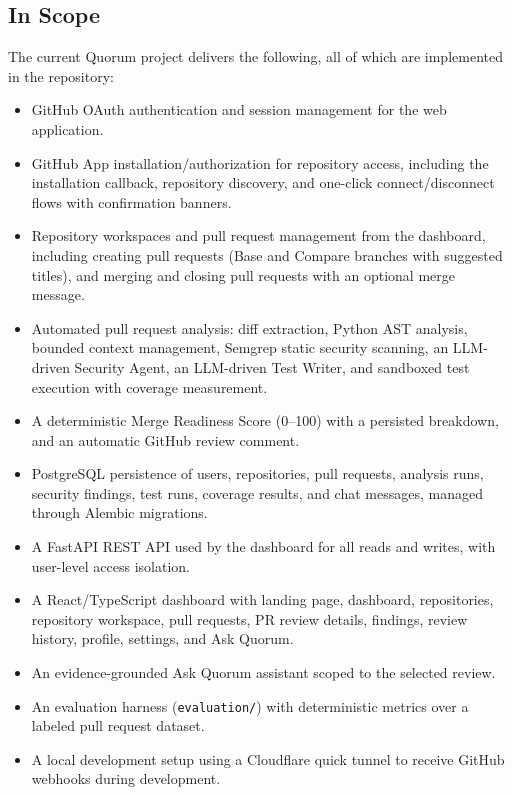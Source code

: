 \subsection{In Scope}

The current Quorum project delivers the following, all of which are implemented
in the repository:

\begin{itemize}
  \item GitHub OAuth authentication and session management for the web
        application.
  \item GitHub App installation/authorization for repository access, including
        the installation callback, repository discovery, and one-click
        connect/disconnect flows with confirmation banners.
  \item Repository workspaces and pull request management from the dashboard,
        including creating pull requests (Base and Compare branches with
        suggested titles), and merging and closing pull requests with an
        optional merge message.
  \item Automated pull request analysis: diff extraction, Python AST
        analysis, bounded context management, Semgrep static security
        scanning, an LLM-driven Security Agent, an LLM-driven Test Writer, and
        sandboxed test execution with coverage measurement.
  \item A deterministic Merge Readiness Score (0--100) with a persisted
        breakdown, and an automatic GitHub review comment.
  \item PostgreSQL persistence of users, repositories, pull requests, analysis
        runs, security findings, test runs, coverage results, and chat
        messages, managed through Alembic migrations.
  \item A FastAPI REST API used by the dashboard for all reads and writes,
        with user-level access isolation.
  \item A React/TypeScript dashboard with landing page, dashboard,
        repositories, repository workspace, pull requests, PR review details,
        findings, review history, profile, settings, and Ask Quorum.
  \item An evidence-grounded Ask Quorum assistant scoped to the selected
        review.
  \item An evaluation harness (\texttt{evaluation/}) with deterministic
        metrics over a labeled pull request dataset.
  \item A local development setup using a Cloudflare quick tunnel to receive
        GitHub webhooks during development.
\end{itemize}

